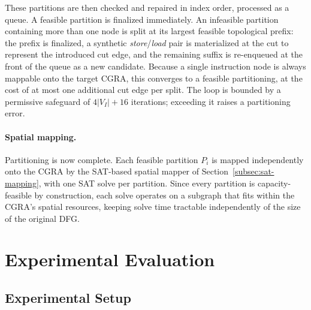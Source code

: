\documentclass[runningheads]{llncs}
\begin{document}
These partitions are then checked and repaired in index order, processed as a queue. A feasible partition is finalized immediately. An infeasible partition containing more than one node is split at its largest feasible topological prefix: the prefix is finalized, a synthetic \textit{store}/\textit{load} pair is materialized at the cut to represent the introduced cut edge, and the remaining suffix is re-enqueued at the front of the queue as a new candidate. Because a single instruction node is always mappable onto the target CGRA, this converges to a feasible partitioning, at the cost of at most one additional cut edge per split. The loop is bounded by a permissive safeguard of $4|V_I| + 16$ iterations; exceeding it raises a partitioning error.

\paragraph{Spatial mapping.}
Partitioning is now complete. Each feasible partition $P_i$ is mapped independently onto the CGRA by the SAT-based spatial mapper of Section~\ref{subsec:sat-mapping}, with one SAT solve per partition. Since every partition is capacity-feasible by construction, each solve operates on a subgraph that fits within the CGRA's spatial resources, keeping solve time tractable independently of the size of the original DFG.

\section{Experimental Evaluation}

\subsection{Experimental Setup}
%

%
%
\end{document}
